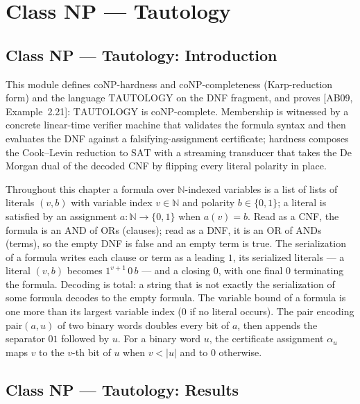 \section{Class NP --- Tautology}
\subsection*{Class NP --- Tautology: Introduction}

This module defines coNP-hardness and coNP-completeness
(Karp-reduction form) and the language $\mathrm{TAUTOLOGY}$ on the DNF fragment, and
proves [AB09, Example~2.21]: $\mathrm{TAUTOLOGY}$ is coNP-complete.
Membership is witnessed by a concrete linear-time verifier machine that validates the
formula syntax and then evaluates the DNF against a falsifying-assignment
certificate; hardness composes the Cook--Levin reduction to $\mathrm{SAT}$ with a
streaming transducer that takes the De Morgan dual of the decoded CNF by flipping
every literal polarity in place.

Throughout this chapter a formula over $\mathbb{N}$-indexed variables is a list of
lists of literals $(v,b)$ with variable index $v \in \mathbb{N}$ and polarity
$b \in \{0,1\}$; a literal is satisfied by an assignment $a : \mathbb{N} \to \{0,1\}$
when $a(v) = b$. Read as a CNF, the formula is an AND of ORs (clauses); read as a
DNF, it is an OR of ANDs (terms), so the empty DNF is false and an empty term is
true. The serialization of a formula writes each clause or term as a leading $1$,
its serialized literals — a literal $(v,b)$ becomes $1^{v+1}\,0\,b$ — and a closing
$0$, with one final $0$ terminating the formula. Decoding is total: a string that is
not exactly the serialization of some formula decodes to the empty formula. The
variable bound of a formula is one more than its largest variable index ($0$ if no
literal occurs). The pair encoding $\mathrm{pair}(a,u)$ of two binary words doubles
every bit of $a$, then appends the separator $01$ followed by $u$. For a binary word
$u$, the certificate assignment $\alpha_u$ maps $v$ to the $v$-th bit of $u$ when
$v < |u|$ and to $0$ otherwise.

\subsection*{Class NP --- Tautology: Results}

